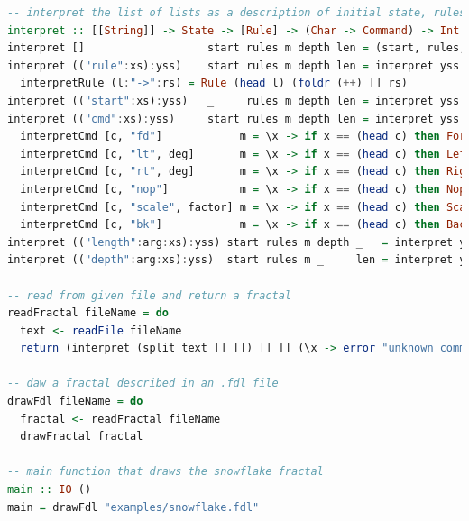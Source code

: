 \documentclass{article}
\begin{document}
\begin{lstlisting}[language=Haskell]
-- interpret the list of lists as a description of initial state, rules, mapping, depth, and length of a fractal
interpret :: [[String]] -> State -> [Rule] -> (Char -> Command) -> Int -> Double -> Fractal
interpret []                   start rules m depth len = (start, rules, m, depth, len)
interpret (("rule":xs):yss)    start rules m depth len = interpret yss start (rules ++ [interpretRule xs]) m depth len where
  interpretRule (l:"->":rs) = Rule (head l) (foldr (++) [] rs)
interpret (("start":xs):yss)   _     rules m depth len = interpret yss (foldr (++) [] xs) rules m depth len
interpret (("cmd":xs):yss)     start rules m depth len = interpret yss start rules (interpretCmd xs m) depth len where
  interpretCmd [c, "fd"]            m = \x -> if x == (head c) then Forward else m x
  interpretCmd [c, "lt", deg]       m = \x -> if x == (head c) then LeftTurn (read deg) else m x
  interpretCmd [c, "rt", deg]       m = \x -> if x == (head c) then RightTurn (read deg) else m x
  interpretCmd [c, "nop"]           m = \x -> if x == (head c) then Nop else m x
  interpretCmd [c, "scale", factor] m = \x -> if x == (head c) then Scale (read factor) else m x
  interpretCmd [c, "bk"]            m = \x -> if x == (head c) then Backward else m x
interpret (("length":arg:xs):yss) start rules m depth _   = interpret yss start rules m depth (read arg)
interpret (("depth":arg:xs):yss)  start rules m _     len = interpret yss start rules m (read arg) len

-- read from given file and return a fractal
readFractal fileName = do
  text <- readFile fileName
  return (interpret (split text [] []) [] [] (\x -> error "unknown command") 0 0)

-- daw a fractal described in an .fdl file
drawFdl fileName = do
  fractal <- readFractal fileName
  drawFractal fractal

-- main function that draws the snowflake fractal
main :: IO ()
main = drawFdl "examples/snowflake.fdl"
\end{lstlisting}
\end{document}

